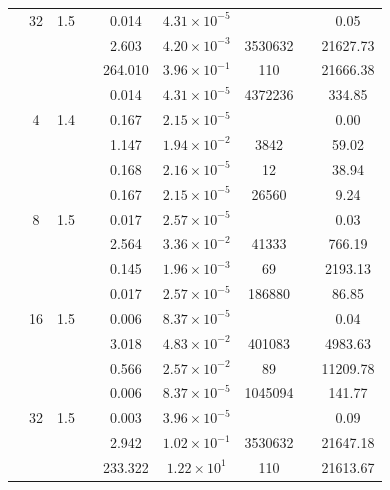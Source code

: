 \begin{table}[htbp]
\begin{tabular}{l S[table-format=3.0] S[table-format=4.1] l S[table-format=3.3] S[table-format=1.2e2] S[table-format=6.0] S[table-format=2.0] S[table-format=4.2]}
     & 32 & 1.5 &  & 0.014 & $4.31 \times 10^{-5}$ & {\text{---}} & {\text{---}} & 0.05 \\
     &  &  &  & 2.603 & $4.20 \times 10^{-3}$ & 3530632 & {\text{---}} & 21627.73 \\
     &  &  &  & 264.010 & $3.96 \times 10^{-1}$ & 110 & {\text{---}} & 21666.38 \\
     &  &  &  & 0.014 & $4.31 \times 10^{-5}$ & 4372236 & {\text{---}} & 334.85 \\
    \midrule
     & 4 & 1.4 &  & 0.167 & $2.15 \times 10^{-5}$ & {\text{---}} & {\text{---}} & 0.00 \\
     &  &  &  & 1.147 & $1.94 \times 10^{-2}$ & 3842 & {\text{---}} & 59.02 \\
     &  &  &  & 0.168 & $2.16 \times 10^{-5}$ & 12 & {\text{---}} & 38.94 \\
     &  &  &  & 0.167 & $2.15 \times 10^{-5}$ & 26560 & {\text{---}} & 9.24 \\
     & 8 & 1.5 &  & 0.017 & $2.57 \times 10^{-5}$ & {\text{---}} & {\text{---}} & 0.03 \\
     &  &  &  & 2.564 & $3.36 \times 10^{-2}$ & 41333 & {\text{---}} & 766.19 \\
     &  &  &  & 0.145 & $1.96 \times 10^{-3}$ & 69 & {\text{---}} & 2193.13 \\
     &  &  &  & 0.017 & $2.57 \times 10^{-5}$ & 186880 & {\text{---}} & 86.85 \\
     & 16 & 1.5 &  & 0.006 & $8.37 \times 10^{-5}$ & {\text{---}} & {\text{---}} & 0.04 \\
     &  &  &  & 3.018 & $4.83 \times 10^{-2}$ & 401083 & {\text{---}} & 4983.63 \\
     &  &  &  & 0.566 & $2.57 \times 10^{-2}$ & 89 & {\text{---}} & 11209.78 \\
     &  &  &  & 0.006 & $8.37 \times 10^{-5}$ & 1045094 & {\text{---}} & 141.77 \\
     & 32 & 1.5 &  & 0.003 & $3.96 \times 10^{-5}$ & {\text{---}} & {\text{---}} & 0.09 \\
     &  &  &  & 2.942 & $1.02 \times 10^{-1}$ & 3530632 & {\text{---}} & 21647.18 \\
     &  &  &  & 233.322 & $1.22 \times 10^{1}$ & 110 & {\text{---}} & 21613.67 \\

\end{tabular}
\end{table}
